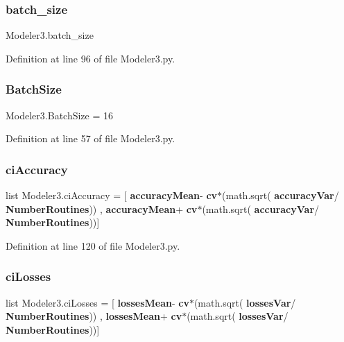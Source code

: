 \mbox{\label{namespace_modeler3_a5876b9daccf8bf4e726fd4360593546d}} 
\subsubsection{batch\+\_\+size}
{\footnotesize\ttfamily Modeler3.\+batch\+\_\+size}



Definition at line 96 of file Modeler3.\+py.

\mbox{\label{namespace_modeler3_adc58063124ee97c034a0b3707bc2b304}} 
\subsubsection{Batch\+Size}
{\footnotesize\ttfamily Modeler3.\+Batch\+Size = 16}



Definition at line 57 of file Modeler3.\+py.

\mbox{\label{namespace_modeler3_a2cd3fb037a6199ad939488df0a7a243b}} 
\subsubsection{ci\+Accuracy}
{\footnotesize\ttfamily list Modeler3.\+ci\+Accuracy = [\textbf{ accuracy\+Mean}-\/\textbf{ cv}$\ast$(math.\+sqrt(\textbf{ accuracy\+Var}/\textbf{ Number\+Routines})) ,\textbf{ accuracy\+Mean}+\textbf{ cv}$\ast$(math.\+sqrt(\textbf{ accuracy\+Var}/\textbf{ Number\+Routines}))]}



Definition at line 120 of file Modeler3.\+py.

\mbox{\label{namespace_modeler3_a3210d5053c8fb0f74a4dce8dcdcf4753}} 
\subsubsection{ci\+Losses}
{\footnotesize\ttfamily list Modeler3.\+ci\+Losses = [\textbf{ losses\+Mean}-\/\textbf{ cv}$\ast$(math.\+sqrt(\textbf{ losses\+Var}/\textbf{ Number\+Routines})) ,\textbf{ losses\+Mean}+\textbf{ cv}$\ast$(math.\+sqrt(\textbf{ losses\+Var}/\textbf{ Number\+Routines}))]}



